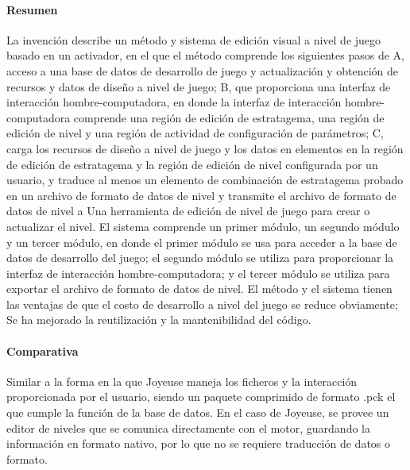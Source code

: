 \documentclass[]{article}
\begin{document}
\paragraph{Resumen}
La invenci\'on describe un m\'etodo y sistema de edici\'on visual a nivel de juego basado en un activador, en el que el m\'etodo comprende los siguientes pasos de 
\newline
\newline A, acceso a una base de datos de desarrollo de juego y actualizaci\'on y obtenci\'on de recursos y datos de dise\~no a nivel de juego; 
\newline
\newline B, que proporciona una interfaz de interacci\'on hombre-computadora, en donde la interfaz de interacci\'on hombre-computadora comprende una regi\'on de edici\'on de estratagema, una regi\'on de edici\'on de nivel y una regi\'on de actividad de configuraci\'on de par\'ametros; 
\newline
\newline
C, carga los recursos de dise\~no a nivel de juego y los datos en elementos en la regi\'on de edici\'on de estratagema y la regi\'on de edici\'on de nivel configurada por un usuario, y traduce al menos un elemento de combinaci\'on de estratagema probado en un archivo de formato de datos de nivel y transmite el archivo de formato de datos de nivel a Una herramienta de edici\'on de nivel de juego para crear o actualizar el nivel. \newline 
\newline El sistema comprende un primer m\'odulo, un segundo m\'odulo y un tercer m\'odulo, en donde el primer m\'odulo se usa para acceder a la base de datos de desarrollo del juego; el segundo m\'odulo se utiliza para proporcionar la interfaz de interacci\'on hombre-computadora; y el tercer m\'odulo se utiliza para exportar el archivo de formato de datos de nivel. El m\'etodo y el sistema tienen las ventajas de que el costo de desarrollo a nivel del juego se reduce obviamente; Se ha mejorado la reutilizaci\'on y la mantenibilidad del c\'odigo.
\cite{leveledit}
\paragraph{Comparativa}

Similar a la forma en la que Joyeuse maneja los ficheros y la interacci\'on proporcionada por el usuario, siendo un paquete comprimido de formato .pck el que cumple la funci\'on de la base de datos. En el caso de Joyeuse, se provee un editor de niveles que se comunica directamente con el motor, guardando la informaci\'on en formato nativo, por lo que no se requiere traducci\'on de datos o formato. 
\end{document}
